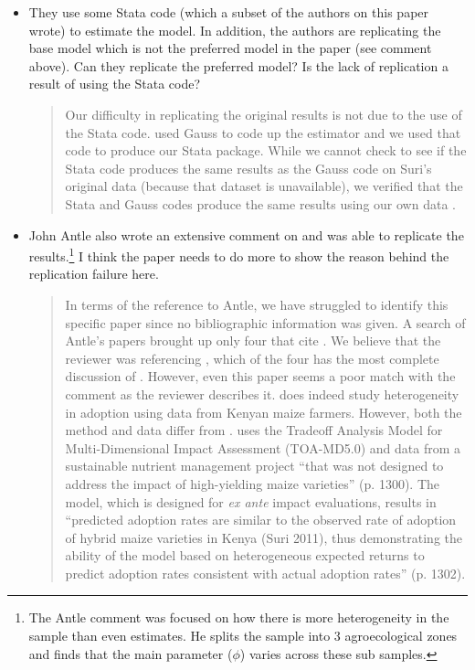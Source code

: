 \documentclass{article}[11pt]
\begin{document}
\begin{enumerate}
  \begin{itemize}
      \item[(a)] They use some Stata code (which a subset of the authors on this paper wrote) to estimate the model. In addition, the authors are replicating the base model which is not the preferred model in the paper (see comment above). Can they replicate the preferred model?  Is the lack of replication a result of using the Stata code?
      \begin{quote}
          Our difficulty in replicating the original \citet{S2011} results is not due to the use of the Stata code. 
          \citet{S2011} used Gauss to code up the estimator and we used that code to produce our Stata package. 
          While we cannot check to see if the Stata code produces the same results as the Gauss code on Suri's original data (because that dataset is unavailable), we verified that the Stata and Gauss codes produce the same results using our own data \citep{michler2019money}.
       \end{quote}

       \item[(b)]  John Antle also wrote an extensive comment on \citet{S2011} and was able to replicate the results.\footnote{The Antle comment was focused on how there is more heterogeneity in the sample than even \citet{S2011} estimates. He splits the sample into 3 agroecological zones and finds that the main parameter ($\phi$) varies across these sub samples.} I think the paper needs to do more to show the reason behind the replication failure here.
       \begin{quote}
          In terms of the reference to Antle, we have struggled to identify this specific paper since no bibliographic information was given. A search of Antle's papers brought up only four that cite \citet{S2011}. We believe that the reviewer was referencing \citet{A2011}, which of the four has the most complete discussion of \citet{S2011}. However, even this paper seems a poor match with the comment as the reviewer describes it. \citet{A2011} does indeed study heterogeneity in adoption using data from Kenyan maize farmers. However, both the method and data differ from \citet{S2011}. \citet{A2011} uses the Tradeoff Analysis Model for Multi-Dimensional Impact Assessment (TOA-MD5.0) and data from a sustainable nutrient management project ``that was not designed to address the impact of high-yielding maize varieties'' (p. 1300). The model, which is designed for \emph{ex ante} impact evaluations, results in ``predicted adoption rates are similar to the observed rate of adoption of hybrid maize varieties in Kenya (Suri 2011), thus demonstrating the ability of the model based on heterogeneous expected returns to predict adoption rates consistent with actual adoption rates'' (p. 1302). \newline
        

\end{quote}
\end{itemize}
\end{enumerate}
\end{document}
